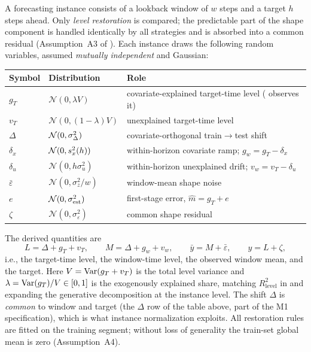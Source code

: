 A forecasting instance consists of a lookback window of $w$ steps and a target $h$ steps ahead. Only \emph{level restoration} is compared; the predictable part of the shape component is handled identically by all strategies and is absorbed into a common residual (Assumption~A3 of ). Each instance draws the following random variables, assumed \emph{mutually independent} and Gaussian:
\begin{center}
\small
\begin{tabular}{@{}lll@{}}
\toprule
Symbol & Distribution & Role \\
\midrule
$g_T$ & $\mathcal{N}(0,\lambda V)$ & covariate-explained target-time level (\cnm{} observes it) \\
$v_T$ & $\mathcal{N}(0,(1-\lambda)V)$ & unexplained target-time level \\
$\Delta$ & $\mathcal{N}(0,\sigma_\Delta^2)$ & covariate-orthogonal train$\to$test shift \\
$\delta_x$ & $\mathcal{N}(0,s_x^2(h))$ & within-horizon covariate ramp; $g_w = g_T - \delta_x$ \\
$\delta_u$ & $\mathcal{N}(0,h\sigma_u^2)$ & within-horizon unexplained drift; $v_w = v_T - \delta_u$ \\
$\bar\varepsilon$ & $\mathcal{N}(0,\sigma_z^2/w)$ & window-mean shape noise \\
$e$ & $\mathcal{N}(0,\sigma_{\mathrm{est}}^2)$ & \cnm{} first-stage error, $\hat m = g_T + e$ \\
$\zeta$ & $\mathcal{N}(0,\sigma_\varepsilon^2)$ & common shape residual \\
\bottomrule
\end{tabular}
\end{center}
The derived quantities are
\begin{equation}\label{eq:app-derived}
  L = \Delta + g_T + v_T, \qquad
  M = \Delta + g_w + v_w, \qquad
  \bar y = M + \bar\varepsilon, \qquad
  y = L + \zeta ,
\end{equation}
i.e., the target-time level, the window-time level, the observed window mean, and the target. Here $V = \mathrm{Var}(g_T + v_T)$ is the total level variance and $\lambda = \mathrm{Var}(g_T)/V \in [0,1]$ is the exogenously explained share, matching $R^2_{\mathrm{level}}$ in  and expanding the generative decomposition  at the instance level. The shift $\Delta$ is \emph{common} to window and target (the $\Delta$ row of the table above, part of the M1 specification), which is what instance normalization exploits. All restoration rules are fitted on the training segment; without loss of generality the train-set global mean is zero (Assumption~A4).

